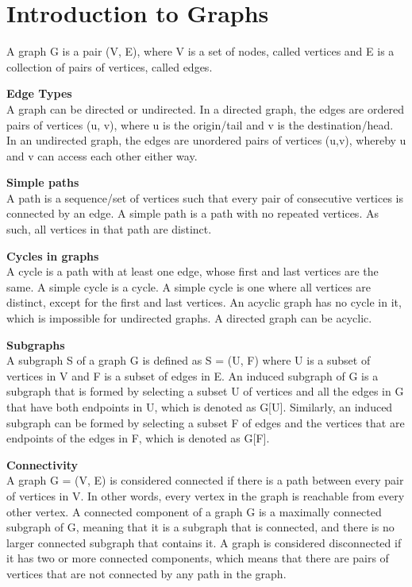 \documentclass[12pt]{article}
\newcommand{\1}{\space \quad}
\newcommand{\2}{\quad \quad \quad}
\newcommand{\3}{\quad \quad \quad \quad \space}
\newcommand{\4}{\quad \quad \quad \quad \quad \quad}
\newcommand{\5}{\quad \quad \quad \quad \quad \quad \quad \space}
\begin{document}
\section{Introduction to Graphs}
A graph G is a pair (V, E), where V is a set of nodes, called vertices and E is a collection of pairs of 
vertices, called edges.

\vspace{10pt}
\textbf{Edge Types}\\
A graph can be directed or undirected. In a directed graph, the edges are ordered pairs of vertices (u, v),
where u is the origin/tail and v is the destination/head. In an undirected graph, the edges are unordered 
pairs of vertices (u,v), whereby u and v can access each other either way.

\vspace{10pt}
\textbf{Simple paths}\\
A path is a sequence/set of vertices such that every pair of consecutive vertices is connected by an edge. A simple
path is a path with no repeated vertices. As such, all vertices in that path are distinct. 

\vspace{10pt}
\textbf{Cycles in graphs}\\
A cycle is a path with at least one edge, whose first and last vertices are the same. A simple cycle is a cycle.
A simple cycle is one where all vertices are distinct, except for the first and last vertices. An acyclic graph has 
no cycle in it, which is impossible for undirected graphs. A directed graph can be acyclic.

\vspace{10pt}
\textbf{Subgraphs}\\
A subgraph S of a graph G is defined as S = (U, F) where U is a subset of vertices in V and F is a subset of edges 
in E. An induced subgraph of G is a subgraph that is formed by selecting a subset U of vertices and all the edges 
in G that have both endpoints in U, which is denoted as G[U]. Similarly, an induced subgraph can be formed by selecting 
a subset F of edges and the vertices that are endpoints of the edges in F, which is denoted as G[F].

\vspace{10pt}
\textbf{Connectivity}\\
A graph G = (V, E) is considered connected if there is a path between every pair of vertices in V. In other words, 
every vertex in the graph is reachable from every other vertex. A connected component of a graph G is a maximally connected 
subgraph of G, meaning that it is a subgraph that is connected, and there is no larger connected subgraph that contains it. 
A graph is considered disconnected if it has two or more connected components, which means that there are pairs of vertices 
that are not connected by any path in the graph.
\end{document}
